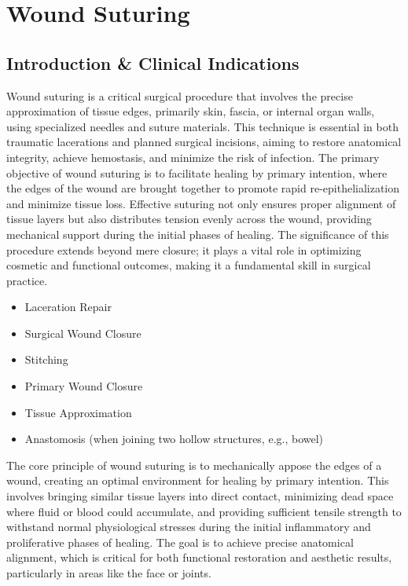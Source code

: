 \chapter{Wound Suturing}

\section*{Introduction \& Clinical Indications}
Wound suturing is a critical surgical procedure that involves the precise approximation of tissue edges, primarily skin, fascia, or internal organ walls, using specialized needles and suture materials. This technique is essential in both traumatic lacerations and planned surgical incisions, aiming to restore anatomical integrity, achieve hemostasis, and minimize the risk of infection. The primary objective of wound suturing is to facilitate healing by primary intention, where the edges of the wound are brought together to promote rapid re-epithelialization and minimize tissue loss. Effective suturing not only ensures proper alignment of tissue layers but also distributes tension evenly across the wound, providing mechanical support during the initial phases of healing. The significance of this procedure extends beyond mere closure; it plays a vital role in optimizing cosmetic and functional outcomes, making it a fundamental skill in surgical practice.

\begin{itemize}
  \item Laceration Repair
  \item Surgical Wound Closure
  \item Stitching
  \item Primary Wound Closure
  \item Tissue Approximation
  \item Anastomosis (when joining two hollow structures, e.g., bowel)
\end{itemize}

The core principle of wound suturing is to mechanically appose the edges of a wound, creating an optimal environment for healing by primary intention. This involves bringing similar tissue layers into direct contact, minimizing dead space where fluid or blood could accumulate, and providing sufficient tensile strength to withstand normal physiological stresses during the initial inflammatory and proliferative phases of healing. The goal is to achieve precise anatomical alignment, which is critical for both functional restoration and aesthetic results, particularly in areas like the face or joints.

